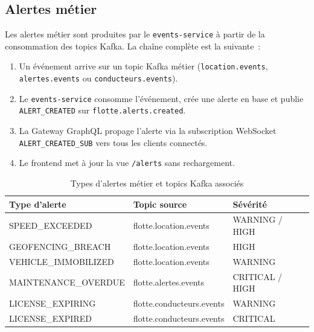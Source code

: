 \documentclass[12pt,a4paper]{article}
\begin{document}
\subsection{Alertes m\'{e}tier}

Les alertes m\'{e}tier sont produites par le \texttt{events-service} \`{a} partir
de la consommation des topics Kafka. La cha\^{i}ne compl\`{e}te est la suivante~:

\begin{enumerate}[leftmargin=*]
  \item Un \'{e}v\'{e}nement arrive sur un topic Kafka m\'{e}tier
        (\texttt{location.events}, \texttt{alertes.events} ou
        \texttt{conducteurs.events}).
  \item Le \texttt{events-service} consomme l'\'{e}v\'{e}nement, cr\'{e}e une alerte
        en base et publie \texttt{ALERT\_CREATED} sur
        \texttt{flotte.alerts.created}.
  \item La Gateway GraphQL propage l'alerte via la subscription WebSocket
        \texttt{ALERT\_CREATED\_SUB} vers tous les clients connect\'{e}s.
  \item Le frontend met \`{a} jour la vue \texttt{/alerts} sans rechargement.
\end{enumerate}

\begin{table}[H]
\centering
\small
\renewcommand{\arraystretch}{1.4}
\begin{tabular}{
  >{\ttfamily\raggedright\arraybackslash}p{4.8cm}
  >{\ttfamily\raggedright\arraybackslash}p{5cm}
  >{\centering\arraybackslash}p{3cm}
}
\toprule
\rowcolor{secondary}
\normalfont\textbf{Type d'alerte} & \normalfont\textbf{Topic source} & \normalfont\textbf{S\'{e}v\'{e}rit\'{e}} \\
\midrule
SPEED\_EXCEEDED        & flotte.location.events    & WARNING / HIGH \\
\rowcolor{rowgray}
GEOFENCING\_BREACH     & flotte.location.events    & HIGH \\
VEHICLE\_IMMOBILIZED   & flotte.location.events    & WARNING \\
\rowcolor{rowgray}
MAINTENANCE\_OVERDUE   & flotte.alertes.events     & CRITICAL / HIGH \\
LICENSE\_EXPIRING      & flotte.conducteurs.events & WARNING \\
\rowcolor{rowgray}
LICENSE\_EXPIRED       & flotte.conducteurs.events & CRITICAL \\
\bottomrule
\end{tabular}
\caption{Types d'alertes m\'{e}tier et topics Kafka associ\'{e}s}
\end{table}
\end{document}
